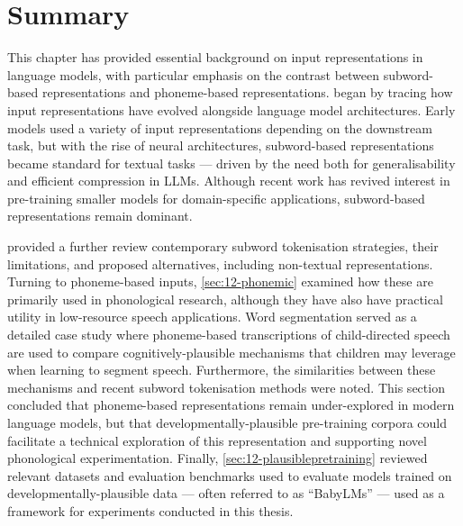 
\section{Summary}


This chapter has provided essential background on input representations in language models, with particular emphasis on the contrast between subword-based representations and phoneme-based representations.  began by tracing how input representations have evolved alongside language model architectures. Early \ngram models used a variety of input representations depending on the downstream task, but with the rise of neural architectures, subword-based representations became standard for textual tasks --- driven by the need both for generalisability and efficient compression in LLMs. Although recent work has revived interest in pre-training smaller models for domain-specific applications, subword-based representations remain dominant.

 provided a further review contemporary subword tokenisation strategies, their limitations, and proposed alternatives, including non-textual representations. Turning to phoneme-based inputs, \cref{sec:12-phonemic} examined how these are primarily used in phonological research, although they have also have practical utility in low-resource speech applications. Word segmentation served as a detailed case study where phoneme-based transcriptions of child-directed speech are used to compare cognitively-plausible mechanisms that children may leverage when learning to segment speech. Furthermore, the similarities between these mechanisms and recent subword tokenisation methods were noted. This section concluded that phoneme-based representations remain under-explored in modern language models, but that developmentally-plausible pre-training corpora could facilitate a technical exploration of this representation and supporting novel phonological experimentation. Finally, \cref{sec:12-plausiblepretraining} reviewed relevant datasets and evaluation benchmarks used to evaluate models trained on developmentally-plausible data --- often referred to as ``BabyLMs'' --- used as a framework for experiments conducted in this thesis. 


